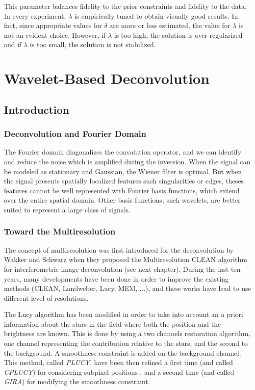 \documentclass[11pt,a4paper]{article}
\begin{document}
This parameter balances fidelity to the prior constraints and fidelity to the
data. In every experiment, $\lambda$ is empirically tuned to obtain 
visually good results. In fact, since appropriate values for $\delta$ are more or
less estimated, the value for $\lambda$ is not an evident choice.
However, if $\lambda$ is too high, the solution is over-regularized and if
$\lambda$ is too small, the solution is not stabilized.


\section{Wavelet-Based Deconvolution}
\subsection{Introduction}
\subsubsection*{Deconvolution and Fourier Domain}
The Fourier domain diagonalizes the convolution operator, and we can identify
and reduce the noise which is amplified during the inversion. When 
the signal can be modeled as stationary and Gaussian, the Wiener filter is
optimal. But when the signal presents spatially localized features such 
singularities or edges, theses features cannot be well represented with 
Fourier basis functions, which extend over the entire spatial domain.
Other basis functions, such wavelets, are better suited to represent a large
class of signals.

\subsubsection*{Toward the Multiresolution}
The concept of multiresolution was first introduced for the deconvolution
by Wakker and Schwarz \cite{rest:wakker88} when they proposed the 
Multiresolution CLEAN algorithm for interferometric image deconvolution 
(see next chapter).
During the last ten years, many developments have been done in order 
to improve the existing methods (CLEAN, Landweber, Lucy, MEM, ...), 
and these works have lead to use different level of resolutions.

The Lucy algorithm has been modified \cite{rest:lucy94b}
in order to take into account an a priori information about 
the stars in the field where 
both the position and the brightness are known. This is done by using a two
channels restoration algorithm, one channel representing the contribution
relative to the stars, and the second to the background. A smoothness 
constraint is added on the background channel. This method, called {\em PLUCY},
have been then refined a first time (and called {\em CPLUCY})
 for considering subpixel positions \cite{rest:hook99}, and a second time
\cite{rest:gira00} (and called {\em GIRA}) for modifying the smoothness
constraint.
\end{document}
